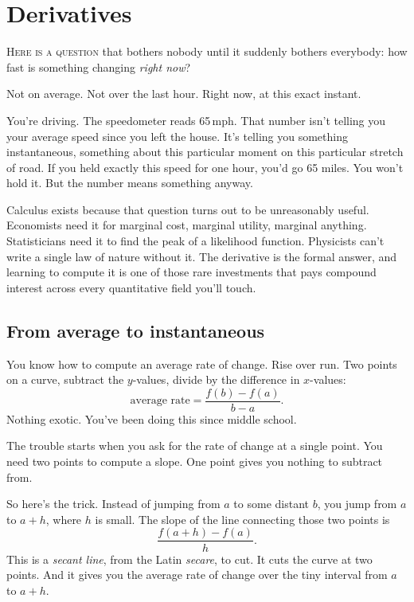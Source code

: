 \chapter{Derivatives}
\label{ch:derivatives}

\noindent\textsc{Here is a question} that bothers nobody until it suddenly bothers everybody: how fast is something changing \emph{right now}?

Not on average. Not over the last hour. Right now, at this exact instant.

You're driving. The speedometer reads 65\,mph. That number isn't telling you your average speed since you left the house. It's telling you something instantaneous, something about this particular moment on this particular stretch of road. If you held exactly this speed for one hour, you'd go 65 miles. You won't hold it. But the number means something anyway.

Calculus exists because that question turns out to be unreasonably useful. Economists need it for marginal cost, marginal utility, marginal anything. Statisticians need it to find the peak of a likelihood function. Physicists can't write a single law of nature without it. The derivative is the formal answer, and learning to compute it is one of those rare investments that pays compound interest across every quantitative field you'll touch.

\section{From average to instantaneous}

You know how to compute an average rate of change. Rise over run. Two points on a curve, subtract the $y$-values, divide by the difference in $x$-values:
\[
  \text{average rate} = \frac{f(b) - f(a)}{b - a}.
\]
Nothing exotic. You've been doing this since middle school.

The trouble starts when you ask for the rate of change at a single point. You need two points to compute a slope. One point gives you nothing to subtract from.

So here's the trick. Instead of jumping from $a$ to some distant $b$, you jump from $a$ to $a + h$, where $h$ is small. The slope of the line connecting those two points is
\[
  \frac{f(a+h) - f(a)}{h}.
\]
This is a \emph{secant line}, from the Latin \emph{secare}, to cut. It cuts the curve at two points. And it gives you the average rate of change over the tiny interval from $a$ to $a+h$.

